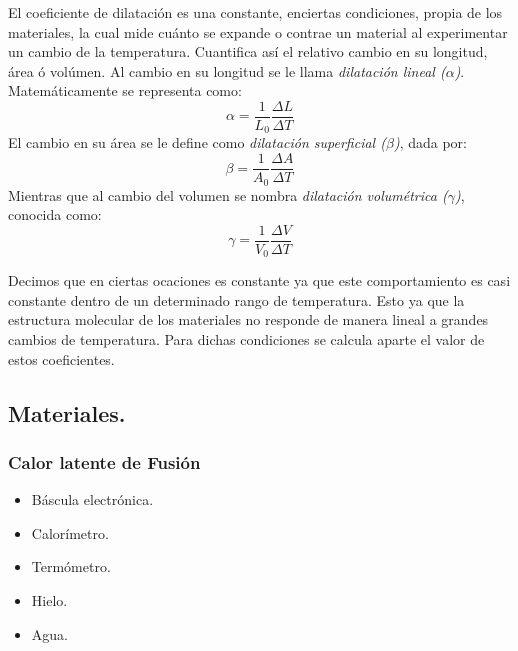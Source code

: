         El coeficiente de dilatación es una constante, enciertas condiciones, propia de los materiales, la cual mide cuánto se expande o contrae un material al experimentar un cambio de la temperatura. Cuantifica así el relativo cambio en su longitud, área ó volúmen. Al cambio en su longitud se le llama \textit{dilatación lineal ($\alpha$)}. Matemáticamente se representa como: 
        \begin{equation}
            \alpha = \frac{1}{L_{0}}\frac{\Delta L}{ \Delta T}
        \end{equation}
        El cambio en su área se le define como \textit{dilatación superficial ($\beta$)}, dada por:
        \begin{equation}
            \beta = \frac{1}{A_{0}}\frac{\Delta A}{ \Delta T}
        \end{equation}
        Mientras que al cambio del volumen se nombra \textit{dilatación volumétrica ($\gamma$)}, conocida como:
        \begin{equation}
            \gamma = \frac{1}{V_{0}}\frac{\Delta V}{ \Delta T}
        \end{equation} 

        Decimos que en ciertas ocaciones es constante ya que este comportamiento es casi constante dentro de un determinado rango de temperatura. Esto ya que la estructura molecular de los materiales no responde de manera lineal a grandes cambios de temperatura. Para dichas condiciones se calcula aparte el valor de estos coeficientes. \cite{CoeficientesDilatación}

    \subsection{Materiales.}
        \subsubsection{Calor latente de Fusión}
            \begin{itemize}
                \item Báscula electrónica.
                \item Calorímetro.
                \item Termómetro.
                \item Hielo.
                \item Agua.
            \end{itemize}

